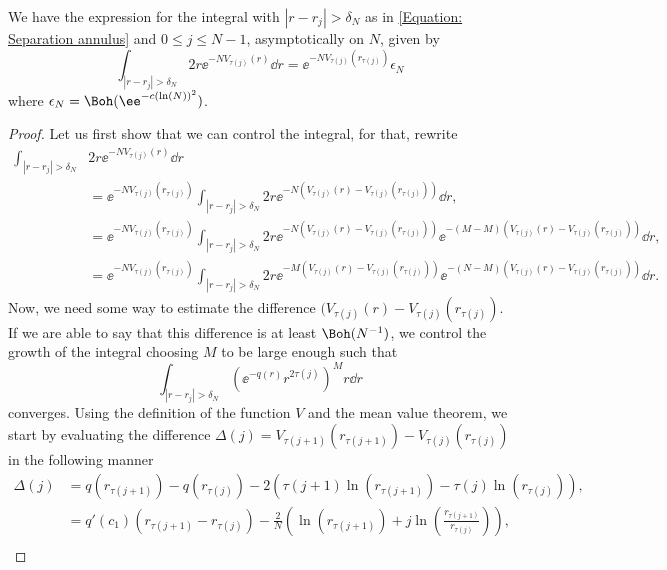 \begin{lema}	\label{Lema: error annulus}
 	We have the expression for the integral  with $|r - r_j| > \delta_N$ as in \eqref{Equation: Separation annulus} and $0 \leq j \leq N-1$, asymptotically on $N$, given by
	\begin{equation}
		\int_{|r - r_j| > \delta_N} 2r \ee^{-N V_{\tau(j)}(r)} \dd r = \ee^{-N V_{\tau(j)}(r_{\tau(j)})} \epsilon_N
	\end{equation}
	where $\epsilon_N = \Boh(\ee^{-c(\ln(N))^2})$.  
\end{lema}
\begin{proof}
	Let us first show that we can control the integral, for that, rewrite
	\begin{align}
	\int_{|r - r_j| > \delta_N} & 2r \ee^{-N V_{\tau(j)}(r)} \dd r
	\\ & = \ee^{-N V_{\tau(j)}(r_{\tau(j)})} \int_{|r - r_j| > \delta_N} 2r \ee^{-N \left( V_{\tau(j)}(r) - V_{\tau(j)}(r_{\tau(j)}) \right)} \dd r, \\
		& = \ee^{-N V_{\tau(j)}(r_{\tau(j)})} \int_{|r - r_j| > \delta_N} 2r \ee^{-N \left( V_{\tau(j)}(r) - V_{\tau(j)}(r_{\tau(j)}) \right)}  \ee^{-(M-M) \left( V_{\tau(j)}(r) - V_{\tau(j)}(r_{\tau(j)}) \right)} \dd r, \\
		& = \ee^{-N V_{\tau(j)}(r_{\tau(j)})} \int_{|r - r_j| > \delta_N} 2r \ee^{-M \left( V_{\tau(j)}(r) - V_{\tau(j)}(r_{\tau(j)}) \right)}  \ee^{-(N-M) \left( V_{\tau(j)}(r) - V_{\tau(j)}(r_{\tau(j)}) \right)} \dd r.
	\end{align}
	Now, we need some way to estimate the difference $(V_{\tau(j)}(r) - V_{\tau(j)}(r_{\tau(j)})$. If we are able to say that this difference is at least $\Boh(N^{-1})$, we control the growth of the integral choosing $M$ to be large enough such that
	\begin{equation}
		\int_{|r - r_j| > \delta_N} \left( \ee^{-q(r)} r^{2 \tau(j)} \right)^M r \dd r
	\end{equation}
	converges. Using the definition of the function $V$ and the mean value theorem, we start by evaluating the difference $\Delta(j) = V_{\tau(j+1)}(r_{\tau(j+1)}) - V_{\tau(j)}(r_{\tau(j)})$ in the following manner
	\begin{align}
		\Delta(j) &= q(r_{\tau(j+1)}) - q(r_{\tau(j)}) - 2 \left( \tau(j+1) \ln(r_{\tau(j+1)}) - \tau(j) \ln(r_{\tau(j)}) \right), \\
		& = q'(c_1) (r_{\tau(j+1)} - r_{\tau(j)}) - \frac{2}{N} \left(\ln(r_{\tau(j+1)})+j\ln\left(\frac{r_{\tau(j+1)}}{r_{\tau(j)}} \right) \right), \\

\end{align}
\end{proof}

